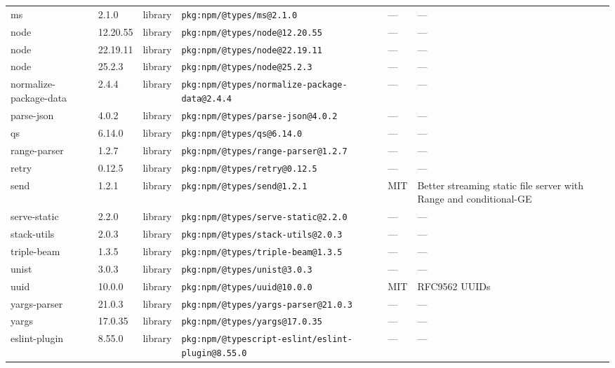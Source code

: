 \documentclass[11pt,a4paper]{article}
\begin{document}
\begin{longtable}{|p{4cm}|p{2cm}|p{1.6cm}|p{5cm}|p{1.5cm}|p{3.5cm}|}
\raggedright ms & 2.1.0 & library & \small\texttt{pkg:npm/@types/ms@2.1.0} & — & \small — \\
\raggedright node & 12.20.55 & library & \small\texttt{pkg:npm/@types/node@12.20.55} & — & \small — \\
\raggedright node & 22.19.11 & library & \small\texttt{pkg:npm/@types/node@22.19.11} & — & \small — \\
\raggedright node & 25.2.3 & library & \small\texttt{pkg:npm/@types/node@25.2.3} & — & \small — \\
\raggedright normalize-package-data & 2.4.4 & library & \small\texttt{pkg:npm/@types/normalize-package-data@2.4.4} & — & \small — \\
\raggedright parse-json & 4.0.2 & library & \small\texttt{pkg:npm/@types/parse-json@4.0.2} & — & \small — \\
\raggedright qs & 6.14.0 & library & \small\texttt{pkg:npm/@types/qs@6.14.0} & — & \small — \\
\raggedright range-parser & 1.2.7 & library & \small\texttt{pkg:npm/@types/range-parser@1.2.7} & — & \small — \\
\raggedright retry & 0.12.5 & library & \small\texttt{pkg:npm/@types/retry@0.12.5} & — & \small — \\
\raggedright send & 1.2.1 & library & \small\texttt{pkg:npm/@types/send@1.2.1} & MIT & \small Better streaming static file server with Range and conditional-GE \\
\raggedright serve-static & 2.2.0 & library & \small\texttt{pkg:npm/@types/serve-static@2.2.0} & — & \small — \\
\raggedright stack-utils & 2.0.3 & library & \small\texttt{pkg:npm/@types/stack-utils@2.0.3} & — & \small — \\
\raggedright triple-beam & 1.3.5 & library & \small\texttt{pkg:npm/@types/triple-beam@1.3.5} & — & \small — \\
\raggedright unist & 3.0.3 & library & \small\texttt{pkg:npm/@types/unist@3.0.3} & — & \small — \\
\raggedright uuid & 10.0.0 & library & \small\texttt{pkg:npm/@types/uuid@10.0.0} & MIT & \small RFC9562 UUIDs \\
\raggedright yargs-parser & 21.0.3 & library & \small\texttt{pkg:npm/@types/yargs-parser@21.0.3} & — & \small — \\
\raggedright yargs & 17.0.35 & library & \small\texttt{pkg:npm/@types/yargs@17.0.35} & — & \small — \\
\raggedright eslint-plugin & 8.55.0 & library & \small\texttt{pkg:npm/@typescript-eslint/eslint-plugin@8.55.0} & — & \small — \\

\end{longtable}
\end{document}
